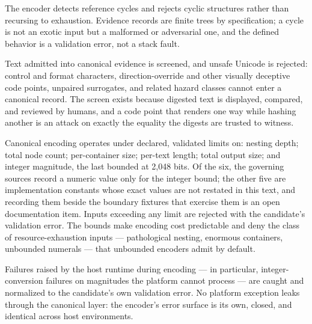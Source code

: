 \begin{invariant}\label{ch03:inv:cycle}
The encoder detects reference cycles and rejects cyclic structures rather than recursing to exhaustion. Evidence records are finite trees by specification; a cycle is not an exotic input but a malformed or adversarial one, and the defined behavior is a validation error, not a stack fault.
\end{invariant}

\begin{invariant}\label{ch03:inv:unicode}
Text admitted into canonical evidence is screened, and unsafe Unicode is rejected: control and format characters, direction-override and other visually deceptive code points, unpaired surrogates, and related hazard classes cannot enter a canonical record. The screen exists because digested text is displayed, compared, and reviewed by humans, and a code point that renders one way while hashing another is an attack on exactly the equality the digests are trusted to witness.
\end{invariant}

\begin{invariant}\label{ch03:inv:bounds}
Canonical encoding operates under declared, validated limits on: nesting depth; total node count; per-container size; per-text length; total output size; and integer magnitude, the last bounded at 2{,}048 bits. Of the six, the governing sources record a numeric value only for the integer bound; the other five are implementation constants whose exact values are not restated in this text, and recording them beside the boundary fixtures that exercise them is an open documentation item. Inputs exceeding any limit are rejected with the candidate's validation error. The bounds make encoding cost predictable and deny the class of resource-exhaustion inputs --- pathological nesting, enormous containers, unbounded numerals --- that unbounded encoders admit by default.
\end{invariant}

\begin{invariant}\label{ch03:inv:hostexc}
Failures raised by the host runtime during encoding --- in particular, integer-conversion failures on magnitudes the platform cannot process --- are caught and normalized to the candidate's own validation error. No platform exception leaks through the canonical layer: the encoder's error surface is its own, closed, and identical across host environments.
\end{invariant}

